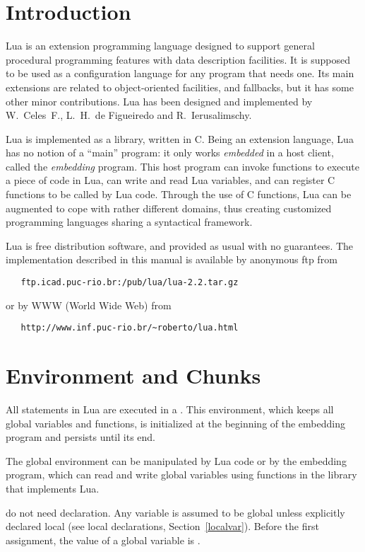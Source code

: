 \section{Introduction}

Lua is an extension programming language designed to support
general procedural programming features with data description
facilities.
It is supposed to be used as a configuration language for any
program that needs one.
Its main extensions are related to object-oriented facilities,
and fallbacks,
but it has some other minor contributions.
Lua has been designed and implemented by
W.~Celes~F., L.~H.~de Figueiredo and R.~Ierusalimschy.

Lua is implemented as a library, written in C.
Being an extension language, Lua has no notion of a ``main'' program:
it only works {\em embedded} in a host client,
called the {\em embedding} program.
This host program can invoke functions to execute a piece of
code in Lua, can write and read Lua variables,
and can register C functions to be called by Lua code.
Through the use of C functions, Lua can be augmented to cope with
rather different domains,
thus creating customized programming languages sharing a syntactical framework.

Lua is free distribution software,
and provided as usual with no guarantees.
The implementation described in this manual is available
by anonymous ftp from
\begin{verbatim}
   ftp.icad.puc-rio.br:/pub/lua/lua-2.2.tar.gz
\end{verbatim}
or by WWW (World Wide Web) from
\begin{verbatim}
   http://www.inf.puc-rio.br/~roberto/lua.html
\end{verbatim}


\section{Environment and Chunks}

All statements in Lua are executed in a .
This environment, which keeps all global variables and functions,
is initialized at the beginning of the embedding program and
persists until its end.

The global environment can be manipulated by Lua code or
by the embedding program,
which can read and write global variables
using functions in the library that implements Lua.

 do not need declaration.
Any variable is assumed to be global unless explicitly declared local
(see local declarations, Section~\ref{localvar}).
Before the first assignment, the value of a global variable is \nil.

